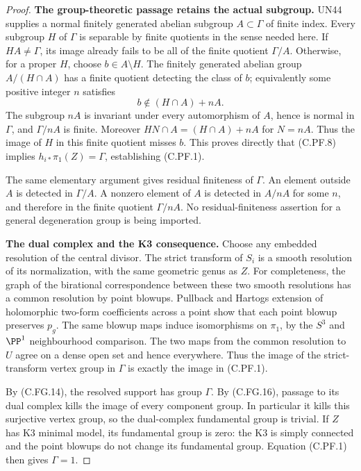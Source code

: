 \begin{proof}
\par\medskip\noindent\textbf{The group-theoretic passage retains the actual subgroup.}
UN44 supplies a normal finitely generated abelian subgroup
$A\subset\Gamma$ of finite index. Every subgroup $H$ of $\Gamma$
is separable by finite quotients in the sense needed here.
If $HA\ne\Gamma$, its image already fails to be all of
the finite quotient $\Gamma/A$. Otherwise, for a proper
$H$, choose $b\in A\setminus H$. The finitely generated
abelian group $A/(H\cap A)$ has a finite quotient detecting
the class of $b$; equivalently some positive integer $n$
satisfies
\[
                         b\notin(H\cap A)+nA .
                                                        \tag{C.PF.9}
\]
The subgroup $nA$ is invariant under every automorphism of $A$,
hence is normal in $\Gamma$, and $\Gamma/nA$ is finite.
Moreover $HN\cap A=(H\cap A)+nA$ for $N=nA$.
Thus the image of $H$ in this finite quotient misses $b$.
This proves directly that (C.PF.8) implies
$h_{i*}\pi_1(Z)=\Gamma$, establishing (C.PF.1).

The same elementary argument gives residual finiteness of
$\Gamma$. An element outside $A$ is detected in $\Gamma/A$.
A nonzero element of $A$ is detected in $A/nA$ for some $n$,
and therefore in the finite quotient $\Gamma/nA$.
No residual-finiteness assertion for a general degeneration
group is being imported.

\par\medskip\noindent\textbf{The dual complex and the K3 consequence.}
Choose any embedded resolution of the central divisor.
The strict transform of $S_i$ is a smooth resolution of its
normalization, with the same geometric genus as $Z$.
For completeness, the graph of the birational correspondence
between these two smooth resolutions has a common resolution
by point blowups. Pullback and Hartogs extension of holomorphic
two-form coefficients across a point show that each point blowup
preserves $p_g$. The same blowup maps induce isomorphisms on
$\pi_1$, by the $S^3$ and $\PP^1$ neighbourhood comparison.
The two maps from the common resolution to $U$ agree on a
dense open set and hence everywhere. Thus the image of the
strict-transform vertex group in $\Gamma$ is exactly the
image in (C.PF.1).

By (C.FG.14), the resolved support has group $\Gamma$.
By (C.FG.16), passage to its dual complex kills the image of
every component group. In particular it kills this surjective
vertex group, so the dual-complex fundamental group is trivial.
If $Z$ has K3 minimal model, its fundamental group is zero:
the K3 is simply connected and the point blowups do not change
its fundamental group. Equation (C.PF.1) then gives $\Gamma=1$.


\end{proof}
